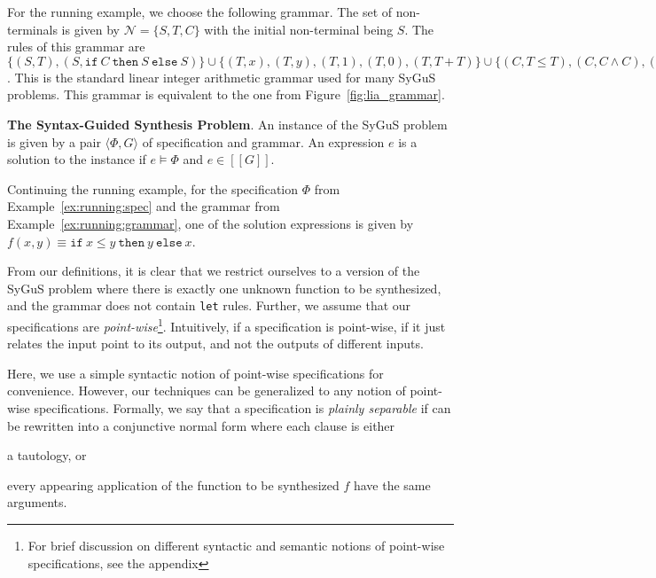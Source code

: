 \documentclass{llncs}
\newcommand\tuple[1]{\langle #1 \rangle}
\newcommand\Expr{e}
\newcommand\Spec{\Phi}
\newcommand\Grammar{G}
\newcommand\sem[1]{[\![ #1 ]\!]}
\newcommand\SynthFun{f}
\newcommand\NonTerminals{\mathcal{N}}
\newcommand\StartSymbol{S}
\newcommand\ITE[3]{\mathtt{if}~#1~\mathtt{then}~#2~\mathtt{else}~#3}
\newcommand{\sygus}{{\sffamily\fontsize{8.5}{10}\selectfont
    SyGuS}\xspace}
\renewcommand{\paragraph}[1]{\par\noindent\textbf{#1}.}
\begin{document}
\begin{example}
  \label{ex:running:grammar}
  For the running example, we choose the following grammar.
  The set of non-terminals is given by $\NonTerminals = \{ \StartSymbol, T, C \}$ with
  the initial non-terminal being $\StartSymbol$.
  The rules of this grammar are $\{ (\StartSymbol, T), (\StartSymbol,
      \ITE{C}{\StartSymbol}{\StartSymbol})
    \} \cup \{ (T, x), (T, y), (T, 1), (T, 0), (T, T + T) \} \cup
        \{ (C, T \leq T), (C, C \wedge C), (C, \neg C) \}$.
  This is the standard linear integer arithmetic grammar used for many
  \sygus problems.
  This grammar is equivalent to the one from
  Figure~\ref{fig:lia_grammar}.
\end{example}

\paragraph{The Syntax-Guided Synthesis Problem}
An instance of the \sygus problem is given by a pair $\tuple { \Spec,
\Grammar }$ of specification and grammar.
An expression $\Expr$ is a solution to the instance if $\Expr \models
\Spec$ and $\Expr \in \sem{\Grammar}$.

\begin{example}
  Continuing the running example, for the specification $\Spec$ from
  Example~\ref{ex:running:spec} and the grammar from
  Example~\ref{ex:running:grammar}, one of the solution expressions is
  given by $\SynthFun(x, y) \equiv \ITE{x \leq y}{y}{x}$.
\end{example}

\vspace*{-3mm}
From our definitions, it is clear that we restrict ourselves to a
version of the \sygus problem where there is exactly one unknown function
to be synthesized, and the grammar does not contain {\tt let} rules.
Further, we assume that our specifications are {\em
  point-wise}\footnote{For brief discussion on different syntactic and
semantic notions of point-wise specifications, see the appendix}.
Intuitively, if a specification is point-wise, if it just relates the
input point to its output, and not the outputs of different inputs.

Here, we use a simple syntactic notion of point-wise specifications for
convenience.
However, our techniques can be generalized to any notion of point-wise
specifications.
Formally, we say that a specification is {\em plainly separable} if can
be rewritten into a conjunctive normal form where each clause is either
\begin{inparaenum}[(a)]
\item a tautology, or
\item every appearing application of the function to be synthesized
  $\SynthFun$ have the same arguments.
\end{inparaenum}
\end{document}
